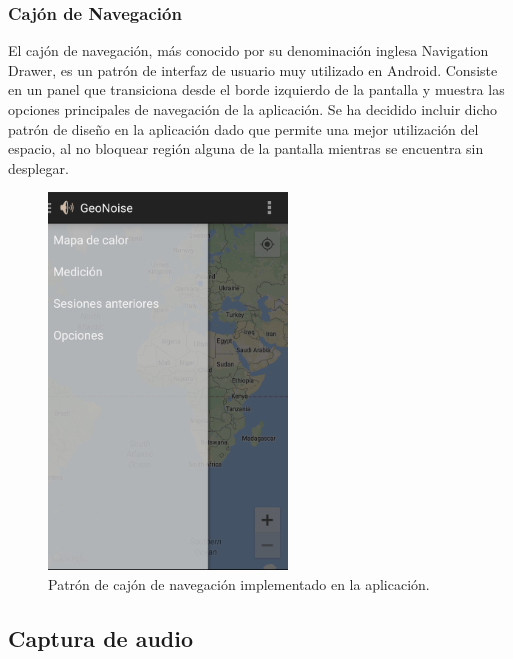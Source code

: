 \subsubsection{Cajón de Navegación}
El cajón de navegación, más conocido por su denominación inglesa Navigation Drawer, es un patrón de interfaz de usuario muy utilizado en Android. Consiste en un panel que transiciona desde el borde izquierdo de la pantalla y muestra las opciones principales de navegación de la aplicación. Se ha decidido incluir dicho patrón de diseño en la aplicación dado que permite una mejor utilización del espacio, al no bloquear región alguna de la pantalla mientras se encuentra sin desplegar.

 \begin{figure}[H] \centering
    \includegraphics[height=10cm]{graphs/navdrawer.png} \caption{Patrón de cajón de navegación implementado en la aplicación.}\label{fig:navdrawer}
\end{figure}

\subsection{Captura de audio}

